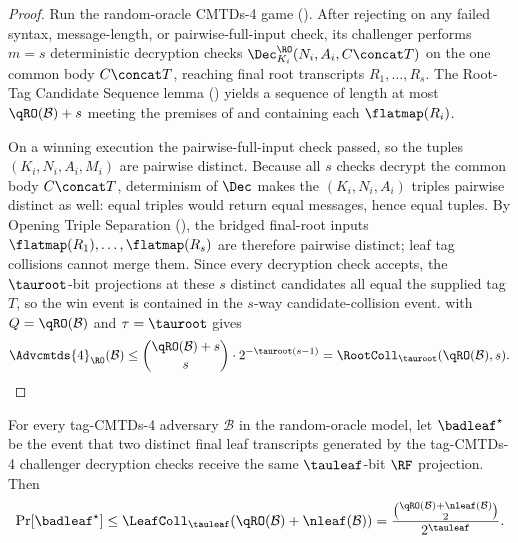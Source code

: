\begin{proof}
Run the random-oracle CMTDs-4 game (). After
rejecting on any failed syntax, message-length, or pairwise-full-input
check, its challenger performs $m = s$ deterministic decryption checks
$\Dec_{K_i}^\RO(N_i,A_i,C \concat T)$ on the one common body
$C \concat T$, reaching final root transcripts $R_1,\dots,R_s$. The
Root-Tag Candidate Sequence lemma () yields
a sequence of length at most $\qRO(\mathcal{B}) + s$ meeting the premises
of  and containing each
$\flatmap(R_i)$.

On a winning execution the pairwise-full-input check passed, so the
tuples $(K_i,N_i,A_i,M_i)$ are pairwise distinct. Because all $s$ checks
decrypt the common body $C \concat T$, determinism of $\Dec$ makes the
$(K_i,N_i,A_i)$ triples pairwise distinct as well: equal triples would
return equal messages, hence equal tuples. By Opening Triple Separation
(), the bridged final-root inputs
$\flatmap(R_1),\dots,\flatmap(R_s)$ are therefore pairwise distinct; leaf
tag collisions cannot merge them. Since every decryption check accepts,
the $\tauroot$-bit projections at these $s$ distinct candidates all equal
the supplied tag $T$, so the win event is contained in the $s$-way
candidate-collision event.  with
$Q=\qRO(\mathcal{B})$ and $\tau=\tauroot$ gives
\[
  \Advcmtds{4}_\RO(\mathcal{B})
  \leq
  \binom{\qRO(\mathcal{B}) + s}{s} \cdot 2^{-\tauroot(s-1)}
  =
  \RootColl_{\tauroot}(\qRO(\mathcal{B}), s).
\]
\end{proof}

\begin{lemma}
\label{lem:known-key-leaf-collision}
For every tag-CMTDs-4 adversary $\mathcal{B}$ in the \TW{} random-oracle
model, let $\badleaf^\star$ be the event that two distinct final leaf
transcripts generated by the tag-CMTDs-4 challenger decryption checks
receive the same $\tauleaf$-bit $\RF$ projection. Then
\[
  \Pr[\badleaf^\star]
  \leq
  \LeafColl_{\tauleaf}(\qRO(\mathcal{B})+\nleaf(\mathcal{B}))
  =
  \frac{\binom{\qRO(\mathcal{B})+\nleaf(\mathcal{B})}{2}}{2^{\tauleaf}}.
\]
\end{lemma}

